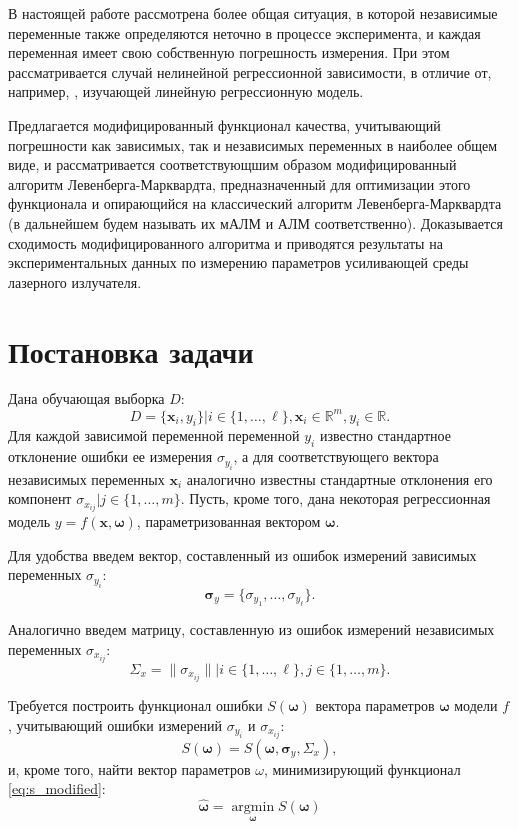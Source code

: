 \documentclass[11pt,a4paper]{article}
\newcommand{\bomega}{\boldsymbol{\omega}}
\begin{document}
В настоящей работе рассмотрена более общая ситуация, в которой независимые
переменные также определяются неточно в процессе эксперимента, и каждая переменная
имеет свою собственную погрешность измерения. При этом рассматривается случай
нелинейной регрессионной зависимости, в отличие от, например,
\cite{kiryati2000heteroscedastic}, изучающей линейную регрессионную модель.

Предлагается модифицированный
функционал качества, учитывающий погрешности как зависимых, так и независимых
переменных в наиболее общем виде, и рассматривается соответствующшим образом
модифицированный алгоритм Левенберга-Марквардта, предназначенный для оптимизации
этого функционала и опирающийся на классический алгоритм Левенберга-Марквардта
(в дальнейшем будем называть их мАЛМ и АЛМ соответственно).
Доказывается сходимость модифицированного алгоритма и приводятся
результаты на экспериментальных данных по измерению параметров усиливающей
среды лазерного излучателя.

\section{Постановка задачи}

Дана обучающая выборка $D$:
\begin{equation}
  D = \{ \mathbf{x}_i, y_i \} | i \in \{ 1, \dots, \ell \}, \mathbf{x}_i \in \mathbb{R}^m, y_i \in \mathbb{R}.
  \label{eq:d}
\end{equation}
Для каждой зависимой переменной переменной $y_i$ известно
стандартное отклонение ошибки ее измерения $\sigma_{y_i}$, а для соответствующего
вектора независимых переменных $\mathbf{x}_i$ аналогично известны стандартные
отклонения его компонент $\sigma_{x_{ij}} | j \in \{ 1, \dots, m \}$.
Пусть, кроме того, дана некоторая регрессионная модель
$y = f (\mathbf{x}, \bomega)$, параметризованная вектором $\bomega$.

Для удобства введем вектор, составленный из ошибок измерений зависимых переменных
$\sigma_{y_i}$:
\[
  \boldsymbol{\sigma}_y = \{ \sigma_{y_1}, \dots, \sigma_{y_{\ell}} \}.
\]

Аналогично введем матрицу, составленную из ошибок измерений независимых переменных
$\sigma_{x_{ij}}$:
\[
  \Sigma_x = \| \sigma_{x_{ij}} \| | i \in \{ 1, \dots, \ell \}, j \in \{ 1, \dots, m \}.
\]

Требуется построить функционал ошибки $S(\bomega)$ вектора параметров
$\bomega$ модели $f$, учитывающий ошибки измерений $\sigma_{y_i}$ и
$\sigma_{x_{ij}}$:
\begin{equation}
  S(\bomega) = S(\bomega, \boldsymbol{\sigma}_y, \Sigma_x),
  \label{eq:s_modified}
\end{equation}
и, кроме того, найти вектор параметров $\omega$, минимизирующий функционал
\eqref{eq:s_modified}:
\begin{equation}
  \hat{\bomega} = \mathop{\arg \min}\limits_{\bomega} S(\bomega)
\end{equation}
\end{document}
